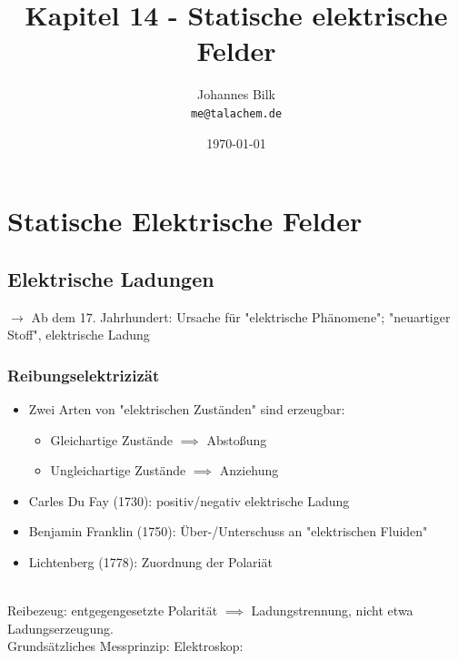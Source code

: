 \documentclass[11pt]{article}
\begin{document}
	\title{Kapitel 14 - Statische elektrische Felder}
		\author
		{Johannes Bilk
			\\
			{\small 	\texttt{me@talachem.de}}
		}
		\date{\today}
	\maketitle
	\tableofcontents
	\setcounter{section}{13} %
	
	\newpage
	
\section{Statische Elektrische Felder}	
	\subsection{ Elektrische Ladungen }	
	
	$\rightarrow$ Ab dem 17. Jahrhundert: Ursache für "elektrische Ph\"{a}nomene"; "neuartiger Stoff", elektrische Ladung
	
		\subsubsection{ Reibungselektriziz\"{a}t }
		
			\begin{itemize}
			\item Zwei Arten von "elektrischen Zust\"{a}nden" sind erzeugbar:
				\begin{itemize}
				\item Gleichartige Zust\"{a}nde $\implies$ Abstoßung
				\item Ungleichartige Zust\"{a}nde $\implies$ Anziehung
			\end{itemize}
			\item Carles Du Fay (1730): positiv/negativ elektrische Ladung
			\item Benjamin Franklin (1750): Über-/Unterschuss an "elektrischen Fluiden"
			\item Lichtenberg (1778): Zuordnung der Polari\"{a}t
			\end{itemize}
			
			\linebreak\\
			Reibezeug: entgegengesetzte Polarit\"{a}t
			$\implies$ Ladungstrennung, nicht etwa Ladungserzeugung.
			\linebreak\\
			Grunds\"{a}tzliches Messprinzip: Elektroskop: \hfill \\
			
\end{document}
